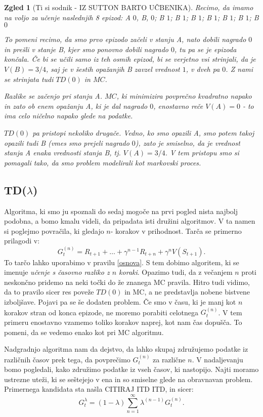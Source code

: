\documentclass[12pt,a4paper]{amsart}
\theoremstyle{definition} %
\theoremstyle{plain} %
\newtheorem{zgled}[definicija]{Zgled}
\begin{document}
\begin{zgled}[Ti si sodnik - IZ SUTTON BARTO UČBENIKA]
    Recimo, da imamo na voljo za učenje naslednjih 8 epizod: 
    A $0$, B, $0$;
    B $1$;
    B $1$;
    B $1$;
    B $1$;
    B $1$;
    B $1$;
    B $0$

    To pomeni recimo, da smo prvo epizodo začeli v stanju A, nato dobili nagrado $0$ in prešli v 
    stanje B, kjer smo ponovno dobili nagrado $0$, tu pa se je epizoda končala. Če bi se učili 
    samo iz teh osmih epizod, bi se verjetno vsi strinjali, da je $V(B) = 3/4$, saj je v šestih
    opažanjih B zavzel vrednost $1$, v dveh pa $0$. Z nami se strinjata tudi $TD(0)$ in $MC$. 

    Razlike se začenjo pri stanju A. $MC$, ki minimizira povprečno kvadratno napako in zato ob 
    enem opažanju A, ki je dal nagrado $0$, enostavno reče $V(A) = 0$ - to ima celo ničelno 
    napako glede na podatke. 

    $TD(0)$ pa pristopi nekoliko drugače. Vedno, ko smo opazili A, smo potem takoj opazili tudi B
    (vmes smo prejeli nagrado $0$), zato je smiselno, da je vrednost stanja A enaka vrednosti 
    stanja B, tj. $V(A) = 3/4$. V tem pristopu smo si pomagali tako, da smo problem modelirali kot 
    markovski proces.
\end{zgled}

\subsection{TD($\lambda$)}
Algoritma, ki smo ju spoznali do sedaj mogoče na prvi pogled nista najbolj podobna, a bomo kmalu 
videli, da pripadata isti družini algoritmov. V ta namen si poglejmo povračila, ki gledajo $n$-
korakov v prihodnost. Tarča se primerno prilagodi v: 
$$
G_t^{(n)} = R_{t+1} + \dots + \gamma^{n-1} R_{t+n} + \gamma^n V(S_{t+1}).
$$
To tarčo lahko uporabimo v pravilu \eqref{osnova}. S tem dobimo algoritem, ki se imenuje \textit{
učenje s časovno razliko z $n$ koraki}. Opazimo tudi, da z večanjem $n$ proti neskončno pridemo na 
neki točki do že znanega MC pravila. Hitro tudi vidimo, da to pravilo sicer res poveže $TD(0)$ in 
MC, a ne predstavlja nobene bistvene izboljšave. Pojavi pa se še dodaten problem. Če smo v času, ki
je manj kot $n$ korakov stran od konca epizode, ne moremo porabiti celotnega $G_t^{(n)}$. V tem 
primeru enostavno vzamemo toliko korakov naprej, kot nam čas dopušča. To pomeni, da se vedemo enako 
kot pri MC algoritmu.

Nadgradnjo algoritma nam da dejstvo, da lahko skupaj združujemo podatke iz različnih časov prek 
tega, da povprečimo $G_t^{(n)}$ za različne $n$. V nadaljevanju bomo pogledali, kako združimo 
podatke iz vseh časov, ki nastopijo. Najti moramo ustrezne uteži, ki se seštejejo v ena in so 
smiselne glede na obravnavan problem. Primernega kandidata sta našla CITIRAJ ITD ITD, in sicer:
$$
G_t^\lambda = (1 - \lambda) \sum_{n=1}^\infty \lambda^{(n-1)} G_t^{(n)}.
$$
\end{document}

